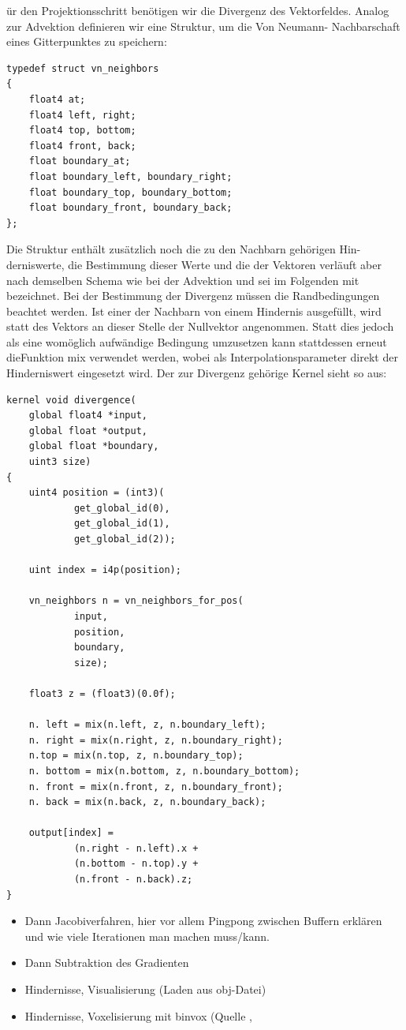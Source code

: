 ür den Projektionsschritt benötigen wir die Divergenz des Vektorfeldes.
Analog zur Advektion definieren wir eine Struktur, um die Von Neumann-
Nachbarschaft eines Gitterpunktes zu speichern:

\begin{verbatim}
typedef struct vn_neighbors
{
    float4 at;
    float4 left, right;
    float4 top, bottom;
    float4 front, back;
    float boundary_at;
    float boundary_left, boundary_right;
    float boundary_top, boundary_bottom;
    float boundary_front, boundary_back;
};
\end{verbatim}

Die Struktur enthält zusätzlich noch die zu den Nachbarn gehörigen Hin-
derniswerte, die Bestimmung dieser Werte und die der Vektoren verläuft aber
nach demselben Schema wie bei der Advektion und sei im Folgenden mit
 bezeichnet.
Bei der Bestimmung der Divergenz müssen die Randbedingungen beachtet werden. Ist
einer der Nachbarn von einem Hindernis ausgefüllt, wird statt des Vektors an
dieser Stelle der Nullvektor angenommen. Statt dies jedoch als eine womöglich
aufwändige Bedingung umzusetzen kann stattdessen erneut dieFunktion mix
verwendet werden, wobei als Interpolationsparameter direkt der Hinderniswert
eingesetzt wird. Der zur Divergenz gehörige Kernel sieht so aus:

\begin{verbatim}
kernel void divergence(
    global float4 *input,
    global float *output,
    global float *boundary,
    uint3 size)
{
    uint4 position = (int3)(
            get_global_id(0),
            get_global_id(1),
            get_global_id(2));

    uint index = i4p(position);

    vn_neighbors n = vn_neighbors_for_pos(
            input,
            position,
            boundary,
            size);

    float3 z = (float3)(0.0f);

    n. left = mix(n.left, z, n.boundary_left);
    n. right = mix(n.right, z, n.boundary_right);
    n.top = mix(n.top, z, n.boundary_top);
    n. bottom = mix(n.bottom, z, n.boundary_bottom);
    n. front = mix(n.front, z, n.boundary_front);
    n. back = mix(n.back, z, n.boundary_back);

    output[index] =
            (n.right - n.left).x +
            (n.bottom - n.top).y +
            (n.front - n.back).z;
}
\end{verbatim}

\begin{itemize}
\item Dann Jacobiverfahren, hier vor allem Pingpong zwischen Buffern erklären
und wie viele Iterationen man machen muss/kann.
\item Dann Subtraktion des Gradienten
\item Hindernisse, Visualisierung (Laden aus obj-Datei)
\item Hindernisse, Voxelisierung mit binvox (Quelle \cite{Nooruddin2003}, \cite{binvox2012}
\end{itemize}
